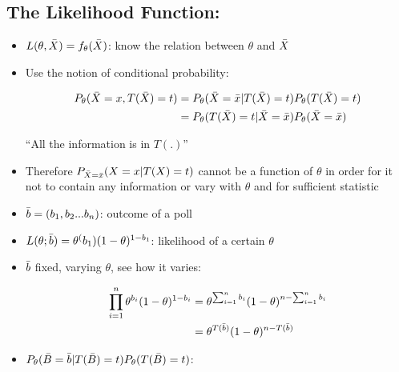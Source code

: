 \documentclass[11pt,letterpaper,titlepage]{article}
\begin{document}
\subsection{The Likelihood Function:}

\begin{itemize}
    
    \item $L(\theta, \Bar{X}) = f_{\theta}(\Bar{X})$: know the relation between $\theta$ and $\Bar{X}$
    
    \item Use the notion of conditional probability:
    
    \begin{equation*}
        \begin{aligned}
            P_{\theta}(\Bar{X} = x, T(\Bar{X}) = t) &= P_{\theta}(\Bar{X} = \Bar{x} | T(\Bar{X}) = t)P_{\theta}(T(\Bar{X}) = t) \\
            &= P_{\theta}(T(\Bar{X}) = t | \Bar{X} = \Bar{x})P_{\theta}(\Bar{X} = \Bar{x})
        \end{aligned}
    \end{equation*}
    
    ``All the information is in $T(.)$''
    
    \item Therefore $P_{\Bar{X} = \Bar{x}}(X=x|T(X) = t)$ cannot be a function of $\theta$ in order for it not to contain any information or vary with $\theta$ and for sufficient statistic
    
    \item $\Bar{b} = (b_1, b_2...b_n)$: outcome of a poll
    
    \item $L(\theta; \Bar{b}) = \theta^(b_1)(1-\theta)^{1-b_1}$: likelihood of a certain $\theta$
    
    \item $\Bar{b}$ fixed, varying $\theta$, see how it varies:
    
    \begin{equation*}
        \begin{aligned}
            \prod_{i = 1}^{n}\theta^{b_i}(1 - \theta)^{1 - b_i} &= \theta^{\sum_{i = 1}^{n} b_i}(1 - \theta)^{n - \sum_{i = 1}^{n} b_i} \\ 
            &= \theta^{T(\Bar{b})}(1-\theta)^{n - T(\Bar{b})}
        \end{aligned}
    \end{equation*}
    
    \item $P_{\theta}(\Bar{B} = \Bar{b} | T(\Bar{B}) = t) P_{\theta}(T(\Bar{B}) = t)$:
    

\end{itemize}
\end{document}
